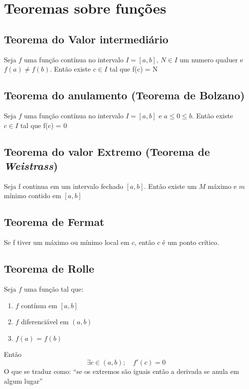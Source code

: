 \chapter{Teoremas sobre funções}

\section{Teorema do Valor intermediário}

Seja \(f\) uma função contínua no intervalo \(I = [a,b]\), \(N \in I\) um numero qualuer e \(f(a) \neq f(b)\).
Então existe \(c \in I\) tal que f(c) = N
    
\section{Teorema do anulamento (Teorema de Bolzano)}

Seja \(f\) uma função contínua no intervalo \(I = [a,b]\) e \(a \leq 0 \leq b\).
Então existe \(c \in I\) tal que f(c) = 0

\section{Teorema do valor Extremo (Teorema de \textit{Weistrass})}

\begin{theorem}
    Seja f continua em um intervalo fechado \([a,b]\).
    Então existe um \(M\) máximo e \(m\) mínimo contido em \([a,b]\)
\end{theorem}

\section{Teorema de Fermat}

\begin{theorem}
    Se f tiver um máximo ou mínimo local em \(c\), então \(c\) é um ponto crítico.
\end{theorem}

\section{Teorema de Rolle}

\begin{theorem}
    Seja \(f\) uma função tal que:
    \begin{enumerate}
        \item \(f\) contínua em \([a,b]\)
        \item \(f\) diferenciável em \((a,b)\)
        \item \(f(a)\) = \(f(b)\)
    \end{enumerate}
    Então
    \begin{equation}
        \exists c \in (a,b);\quad f'(c) = 0
    \end{equation}
    O que se traduz como: ``se os extremos são iguais então a derivada se anula em algum lugar''
\end{theorem}

